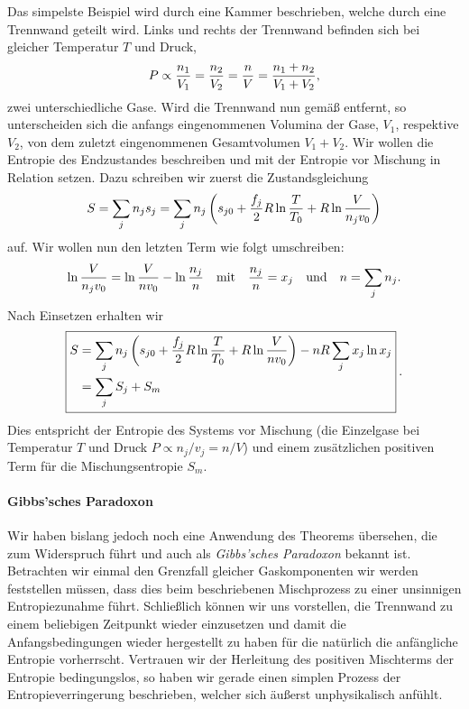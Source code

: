 Das simpelste Beispiel wird durch eine Kammer beschrieben, welche durch eine Trennwand geteilt wird. Links und rechts der Trennwand befinden sich bei gleicher Temperatur $T$ und Druck,
\begin{align*}
    P\propto\frac{n _1}{V_1}=\frac{n _2}{V_2}=\frac{n }{V}=\frac{n _1+n _2}{V_1+V_2},
\end{align*}
zwei unterschiedliche Gase. Wird die Trennwand nun gemäß  entfernt, so unterscheiden sich die anfangs eingenommenen Volumina der Gase, $V_1$, respektive $V_2$, von dem zuletzt eingenommenen Gesamtvolumen $V_1+V_2$.
Wir wollen die Entropie des Endzustandes beschreiben und mit der Entropie vor Mischung in Relation setzen. Dazu schreiben wir zuerst die Zustandsgleichung
\begin{align*}
    S=\sum_jn _js_j=\sum_jn _j\left(s_{j0}+\frac{f_j}{2}R\ln\frac{T}{T_0}+R\ln\frac{V}{n _jv_0}\right)
\end{align*}
auf. Wir wollen nun den letzten Term wie folgt umschreiben:
\begin{align*}
    \ln\frac{V}{n _jv_0}=\ln\frac{V}{n v_0}-\ln\frac{n _j}{n }\quad\text{mit}\quad\frac{n _j}{n }=x_j\quad\text{und}\quad n =\sum_jn _j.
\end{align*}
Nach Einsetzen erhalten wir
\begin{align*}
    \boxed{
        \begin{aligned}
            S & =\sum_jn _j\left(s_{j0}+\frac{f_j}{2}R\ln\frac{T}{T_0}+R\ln\frac{V}{n v_0}\right)-n R\sum_jx_j\ln x_j                 \\
              & =\sum_jS_j+S_m
        \end{aligned}
    }\:.
\end{align*}
Dies entspricht der Entropie des Systems vor Mischung (die Einzelgase bei Temperatur $T$ und Druck $P \propto n_j/v_j=n/V$) und einem zusätzlichen positiven Term für die Mischungsentropie $S_m$.
\paragraph*{Gibbs'sches Paradoxon}
Wir haben bislang jedoch noch eine Anwendung des Theorems übersehen, die zum Widerspruch führt und auch als \emph{Gibbs'sches Paradoxon} bekannt ist.
Betrachten wir einmal den Grenzfall gleicher Gaskomponenten \textendash{} wir werden feststellen müssen, dass dies beim beschriebenen Mischprozess zu einer unsinnigen Entropiezunahme führt. Schließlich können wir uns vorstellen, die Trennwand zu einem beliebigen Zeitpunkt wieder einzusetzen und damit die Anfangsbedingungen wieder hergestellt zu haben \textendash{} für die natürlich die anfängliche Entropie vorherrscht. Vertrauen wir der Herleitung des positiven Mischterms der Entropie bedingungslos, so haben wir gerade einen simplen Prozess der Entropieverringerung beschrieben, welcher sich äußerst unphysikalisch anfühlt. 


